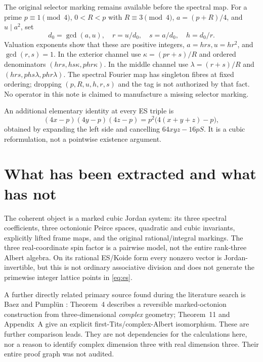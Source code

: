 \documentclass[11pt]{article}
\theoremstyle{definition}\newtheorem{definition}[theorem]{Definition}
\begin{document}
The original selector marking remains available before the spectral map. For a prime $p\equiv1\pmod4$, $0<R<p$ with $R\equiv3\pmod4$, $a=(p+R)/4$, and $u\mid a^2$, set
\[
 d_0=\gcd(a,u),\quad r=u/d_0,\quad s=a/d_0,\quad h=d_0/r.
\]
Valuation exponents show that these are positive integers, $a=hrs,u=hr^2$, and $\gcd(r,s)=1$. In the exterior channel use $\kappa=(pr+s)/R$ and ordered denominators $(hrs,hs\kappa,phr\kappa)$. In the middle channel use $\lambda=(r+s)/R$ and $(hrs,phs\lambda,phr\lambda)$. The spectral Fourier map has singleton fibres at fixed ordering; dropping $(p,R,u,h,r,s)$ and the tag is not authorized by that fact. No operator in this note is claimed to manufacture a missing selector marking.

An additional elementary identity at every ES triple is
\[
 (4x-p)(4y-p)(4z-p)=p^2\big(4(x+y+z)-p\big),
\]
obtained by expanding the left side and cancelling $64xyz-16pS$. It is a cubic reformulation, not a pointwise existence argument.

\section{What has been extracted and what has not}
The coherent object is a marked cubic Jordan system: its three spectral coefficients, three octonionic Peirce spaces, quadratic and cubic invariants, explicitly lifted frame maps, and the original rational/integral markings. The three real-coordinate spin factor is a pairwise model, not the entire rank-three Albert algebra. On its rational ES/Koide form every nonzero vector is Jordan-invertible, but this is not ordinary associative division and does not generate the primewise integer lattice points in \eqref{eq:es}.

A further directly related primary source found during the literature search is Baez and Pumpl\"un \cite{baezpumplun}: Theorem~4 describes a reversible marked-octonion construction from three-dimensional \emph{complex} geometry; Theorem~11 and Appendix~A give an explicit first-Tits/complex-Albert isomorphism. These are further comparison leads. They are not dependencies for the calculations here, nor a reason to identify complex dimension three with real dimension three. Their entire proof graph was not audited.
\end{document}
